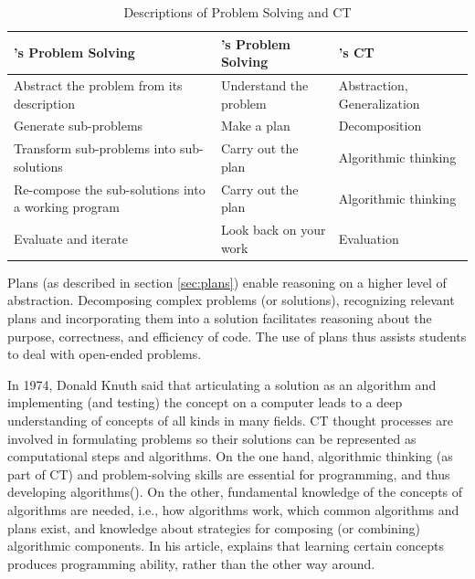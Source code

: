 \begin{table}
  \centering
\begin{tabular}{|p{50mm}|p{45mm}|p{50mm}|}
  \hline
  \textbf{\citeauthor{McCracken2001}'s Problem Solving} & \textbf{\citeauthor{polya2004solve}'s Problem Solving} & \textbf{\cite{selby2013computational}'s CT} \\
  \hline


    Abstract the problem from its description & Understand the problem & Abstraction, Generalization \\ \hline

    Generate sub-problems & Make a plan & Decomposition \\ \hline

    Transform sub-problems into sub-solutions & Carry out the plan & Algorithmic thinking \\ \hline

    Re-compose the sub-solutions into a working program & Carry out the plan & Algorithmic thinking \\ \hline

    Evaluate and iterate & Look back on your work & Evaluation \\ \hline

  \hline
\end{tabular}
\caption{Descriptions of Problem Solving and CT}\label{table:problemSolvingCT}
\end{table}





Plans (as described in section \ref{sec:plans}) enable reasoning on a higher level of abstraction. Decomposing complex problems (or solutions), recognizing relevant plans and incorporating them into a solution facilitates reasoning about the purpose, correctness, and efficiency of code.  The use of plans thus assists students to deal with open-ended problems.

In 1974, Donald Knuth said that articulating a solution as an algorithm and implementing (and testing) the concept on a computer leads to a deep understanding of concepts of all kinds in many fields. CT thought processes are involved in formulating problems so their solutions can be represented as computational steps and algorithms\cite{aho2012computation}. On the one hand, algorithmic thinking (as part of CT) and problem-solving skills are essential for programming, and thus developing algorithms(\cite{McCracken2001}). On the other, fundamental knowledge of the concepts of algorithms are needed, i.e., how algorithms work, which common algorithms and plans exist, and knowledge about strategies for composing (or combining) algorithmic components\cite{deRaadt2008}. In his article,  explains that learning certain concepts produces programming ability, rather than the other way around.





